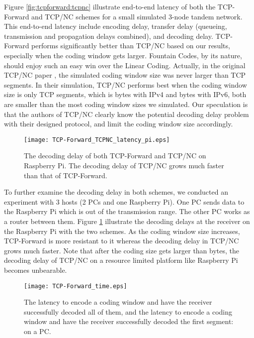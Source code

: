 \documentclass[10pt, conference, final, letterpaper]{IEEEtran}
\theoremstyle{definition}
\begin{document}
Figure \ref{fig:tcpforward:tcpnc} illustrate end-to-end latency of both the TCP-Forward and TCP/NC schemes for a small simulated 3-node tandem network. This end-to-end latency include encoding delay, transfer delay (queueing, transmission and propagation delays combined), and decoding delay. TCP-Forward performs significantly better than TCP/NC based on our results, especially when the coding window gets larger. Fountain Codes, by its nature, should enjoy such an easy win over the Linear Coding. Actually, in the original TCP/NC paper \cite{TCPNC}, the simulated coding window size was never larger than  TCP segments. In their simulation, TCP/NC performs best when the coding window size is only  TCP segments, which is  bytes with IPv4 and  bytes with IPv6, both are smaller than the most coding window sizes we simulated. Our speculation is that the authors of TCP/NC clearly know the potential decoding delay problem with their designed protocol, and limit the coding window size accordingly.

\begin{figure}[thb]
	\begin{center}
		\texttt{[image: TCP-Forward\_TCPNC\_latency\_pi.eps]}
	\end{center}
	\caption{The decoding delay of both TCP-Forward and TCP/NC on Raspberry Pi. The decoding delay of TCP/NC grows much faster than that of TCP-Forward.}
	\label{fig:tcpforward:tcpnc:pi}
\end{figure}

To further examine the decoding delay in both schemes, we conducted an experiment with 3 hosts (2 PCs and one Raspberry Pi). One PC sends data to the Raspberry Pi which is out of the transmission range. The other PC works as a router between them. Figure \ref{fig:tcpforward:tcpnc:pi} illustrate the decoding delays at the receiver on the Raspberry Pi with the two schemes. As the coding window size increases, TCP-Forward is more resistant to it whereas the decoding delay in TCP/NC grows much faster. Note that after the coding size gets larger than  bytes, the decoding delay of TCP/NC on a resource limited platform like Raspberry Pi becomes unbearable.

\begin{figure}[hbt]
	\begin{center}
		\texttt{[image: TCP-Forward\_time.eps]}
	\end{center}
	\caption{The latency to encode a coding window and have the receiver successfully decoded all of them, and the latency to encode a coding window and have the receiver successfully decoded the first segment: on a PC.}
	\label{fig:tcpforward:times}
\end{figure}
\end{document}
